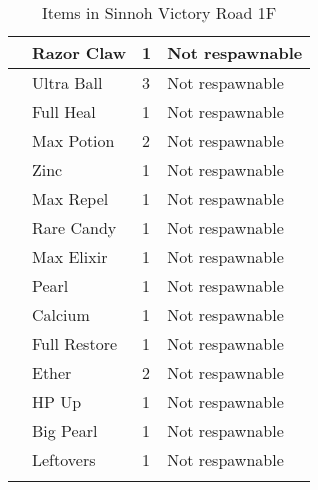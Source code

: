 \begin{longtable}{|| l l l l ||}%
\hline%
&Razor Claw&1&Not respawnable\\%
\hline%
&Ultra Ball&3&Not respawnable\\%
\hline%
&Full Heal&1&Not respawnable\\%
\hline%
&Max Potion&2&Not respawnable\\%
\hline%
&Zinc&1&Not respawnable\\%
\hline%
&Max Repel&1&Not respawnable\\%
\hline%
&Rare Candy&1&Not respawnable\\%
\hline%
&Max Elixir&1&Not respawnable\\%
\hline%
&Pearl&1&Not respawnable\\%
\hline%
&Calcium&1&Not respawnable\\%
\hline%
&Full Restore&1&Not respawnable\\%
\hline%
&Ether&2&Not respawnable\\%
\hline%
&HP Up&1&Not respawnable\\%
\hline%
&Big Pearl&1&Not respawnable\\%
\hline%
&Leftovers&1&Not respawnable\\%
\hline%
\endhead%
\hline%
\caption{Items in Sinnoh Victory Road 1F}%
\label{tab:SinnohVictoryRoad1FItems}%
\end{longtable}